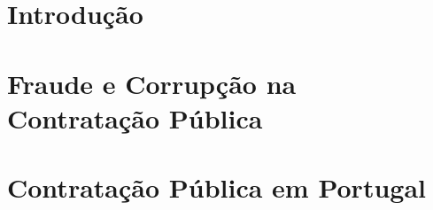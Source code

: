 \documentclass[11pt,openright]{book}
\begin{document}
\chapter{Introdução}




\chapter{Fraude e Corrupção na Contratação Pública}




\chapter{Contratação Pública em Portugal}




%
%
%
%
%
%
%
%
%
%
%
%







%	
%	
%	

\nocite{*}


\end{document}

